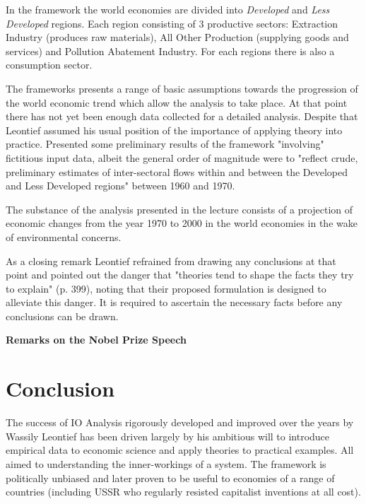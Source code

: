 \documentclass[12pt,a4paper]{scrartcl}
\begin{document}
	In the framework the world economies are divided into \textit{Developed} and \textit{Less Developed} regions. Each region consisting of 3 productive sectors: Extraction Industry (produces raw materials), All Other Production (supplying goods and services) and Pollution Abatement Industry. For each regions there is also a consumption sector.
	
	The frameworks presents a range of basic assumptions towards the progression of the world economic trend which allow the analysis to take place. At that point there has not yet been enough data collected for a detailed analysis. Despite that Leontief assumed his usual position of the importance of applying theory into practice. Presented some preliminary results of the framework "involving" fictitious input data, albeit the general order of magnitude were to "reflect crude, preliminary estimates of inter-sectoral flows within and between the Developed and Less Developed regions" \cite[p. 389]{leontief1974} between 1960 and 1970.
	
	The substance of the analysis presented in the lecture consists of a projection of economic changes from the year 1970 to 2000 in the world economies in the wake of environmental concerns. 
	
	As a closing remark Leontief refrained from drawing any conclusions at that point and pointed out the danger that "theories tend to shape the facts they try to explain" (p. 399), noting that their proposed formulation is designed to alleviate this danger. It is required to ascertain the necessary facts before any conclusions can be drawn. \cite[pp. 387-401]{leontief1974} \cite[pp. 75-77]{dymond2015recent}
	
	\textbf{Remarks on the Nobel Prize Speech}	
		

	\section{Conclusion}
	
	The success of IO Analysis rigorously developed and improved over the years by Wassily Leontief has been driven largely by his ambitious will to introduce empirical data to economic science and apply theories to practical examples. All aimed to understanding the inner-workings of a system. The framework is politically unbiased and later proven to be useful to economies of a range of countries (including USSR who regularly resisted capitalist inventions at all cost).
	
\end{document}
